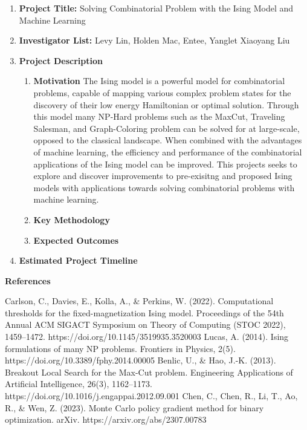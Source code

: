 \documentclass{article}
\begin{document}
\begin{enumerate}
\item \textbf{Project Title:} Solving Combinatorial Problem with the Ising Model and Machine Learning

\item \textbf{Investigator List:} Levy Lin, Holden Mac, Entee, Yanglet Xiaoyang Liu

\item \textbf{Project Description}
	\begin{enumerate}
		\item \textbf{Motivation}
		\newline
		The Ising model is a powerful model for combinatorial problems, capable of mapping various complex problem states for the discovery of their low energy Hamiltonian or optimal solution. Through this model many NP-Hard problems such as the MaxCut, Traveling Salesman, and Graph-Coloring problem can be solved for at large-scale, opposed to the classical landscape. When combined with the advantages of machine learning, the efficiency and performance of the combinatorial applications of the Ising model can be improved. This projects seeks to explore and discover improvements to pre-exisitng and proposed Ising models with applications towards solving combinatorial problems with machine learning. 

		\item \textbf{Key Methodology}

		\item \textbf{Expected Outcomes}

		
	\end{enumerate}

\item \textbf{Estimated Project Timeline}
\end{enumerate}

\textbf{References}
\begin{thebibliography}{00}
Carlson, C., Davies, E., Kolla, A., \& Perkins, W. (2022). Computational thresholds for the fixed-magnetization Ising model. Proceedings of the 54th Annual ACM SIGACT Symposium on Theory of Computing (STOC 2022), 1459–1472. https://doi.org/10.1145/3519935.3520003
Lucas, A. (2014). Ising formulations of many NP problems. Frontiers in Physics, 2(5). https://doi.org/10.3389/fphy.2014.00005
Benlic, U., \& Hao, J.-K. (2013). Breakout Local Search for the Max-Cut problem. Engineering Applications of Artificial Intelligence, 26(3), 1162–1173. https://doi.org/10.1016/j.engappai.2012.09.001
Chen, C., Chen, R., Li, T., Ao, R., \& Wen, Z. (2023). Monte Carlo policy gradient method for binary optimization. arXiv. https://arxiv.org/abs/2307.00783


\end{thebibliography}
\end{document}
